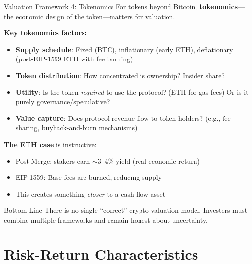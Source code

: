 \documentclass[10pt]{beamer}
\begin{document}
\begin{frame}{Valuation Framework 4: Tokenomics}
  For tokens beyond Bitcoin, \textbf{tokenomics}---the economic design of the token---matters for valuation.
  
  \vspace{0.5em}
  \textbf{Key tokenomics factors:}
  \begin{itemize}
    \item \textbf{Supply schedule}: Fixed (BTC), inflationary (early ETH), deflationary (post-EIP-1559 ETH with fee burning)
    \item \textbf{Token distribution}: How concentrated is ownership? Insider share?
    \item \textbf{Utility}: Is the token \textit{required} to use the protocol? (ETH for gas fees) Or is it purely governance/speculative?
    \item \textbf{Value capture}: Does protocol revenue flow to token holders? (e.g., fee-sharing, buyback-and-burn mechanisms)
  \end{itemize}
  
  \vspace{0.5em}
  \textbf{The ETH case} is instructive:
  \begin{itemize}
    \item Post-Merge: stakers earn $\sim$3--4\% yield (real economic return)
    \item EIP-1559: Base fees are burned, reducing supply
    \item This creates something \textit{closer} to a cash-flow asset
  \end{itemize}
  
  \vspace{0.3em}
  \begin{block}{Bottom Line}
    There is no single ``correct'' crypto valuation model. Investors must combine multiple frameworks and remain honest about uncertainty.
  \end{block}
\end{frame}

\section{Risk-Return Characteristics}
\end{document}
